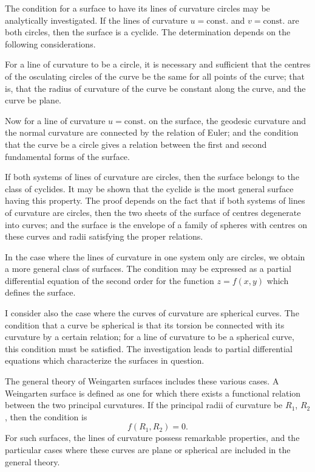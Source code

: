 \documentclass[11pt,a4paper]{article}
\theoremstyle{plain}
\theoremstyle{definition}
\begin{document}
The condition for a surface to have its lines of curvature circles may be analytically investigated. If the lines of curvature $u = \text{const.}$ and $v = \text{const.}$ are both circles, then the surface is a cyclide. The determination depends on the following considerations.

For a line of curvature to be a circle, it is necessary and sufficient that the centres of the osculating circles of the curve be the same for all points of the curve; that is, that the radius of curvature of the curve be constant along the curve, and the curve be plane.

Now for a line of curvature $u = \text{const.}$ on the surface, the geodesic curvature and the normal curvature are connected by the relation of Euler; and the condition that the curve be a circle gives a relation between the first and second fundamental forms of the surface.

If both systems of lines of curvature are circles, then the surface belongs to the class of cyclides. It may be shown that the cyclide is the most general surface having this property. The proof depends on the fact that if both systems of lines of curvature are circles, then the two sheets of the surface of centres degenerate into curves; and the surface is the envelope of a family of spheres with centres on these curves and radii satisfying the proper relations.

In the case where the lines of curvature in one system only are circles, we obtain a more general class of surfaces. The condition may be expressed as a partial differential equation of the second order for the function $z = f(x,y)$ which defines the surface.

I consider also the case where the curves of curvature are spherical curves. The condition that a curve be spherical is that its torsion be connected with its curvature by a certain relation; for a line of curvature to be a spherical curve, this condition must be satisfied. The investigation leads to partial differential equations which characterize the surfaces in question.

The general theory of Weingarten surfaces includes these various cases. A Weingarten surface is defined as one for which there exists a functional relation between the two principal curvatures. If the principal radii of curvature be $R_1$, $R_2$, then the condition is
\[ f(R_1, R_2) = 0. \]
For such surfaces, the lines of curvature possess remarkable properties, and the particular cases where these curves are plane or spherical are included in the general theory.
\end{document}
